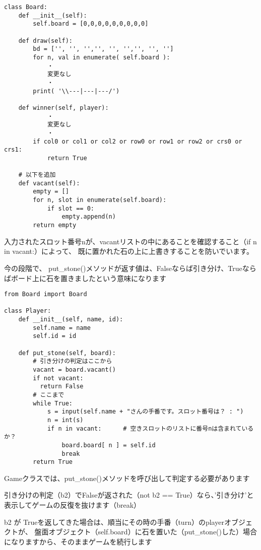 \documentclass[uplatex,a4paper,11pt,oneside,openany]{jsbook}
\begin{document}
\begin{lstlisting}[caption=class Board,label=prog03-5]
class Board:
    def __init__(self):
        self.board = [0,0,0,0,0,0,0,0,0]

    def draw(self):
        bd = ['', '', '','', '', '','', '', '']
        for n, val in enumerate( self.board ):
            ・
            変更なし
            ・
        print( '\\---|---|---/')

    def winner(self, player):
            ・
            変更なし
            ・
        if col0 or col1 or col2 or row0 or row1 or row2 or crs0 or crs1:
            return True

    # 以下を追加
    def vacant(self):
        empty = []
        for n, slot in enumerate(self.board):
            if slot == 0:
                empty.append(n)
        return empty
\end{lstlisting}%

入力されたスロット番号nが、vacantリストの中にあることを確認すること（if n in vacant:）によって、
既に置かれた石の上に上書きすることを防いでいます。

今の段階で、
put\_stone()メソッドが返す値は、Falseならば引き分け、Trueならばボード上に石を置きましたという意味になります

\begin{lstlisting}[caption=class Player,label=prog03-3]
from Board import Board

class Player:
    def __init__(self, name, id):
        self.name = name
        self.id = id

    def put_stone(self, board):
        # 引き分けの判定はここから
        vacant = board.vacant()
        if not vacant:
          return False
        # ここまで
        while True:
            s = input(self.name + "さんの手番です。スロット番号は？ : ")
            n = int(s)
            if n in vacant:      # 空きスロットのリストに番号nは含まれているか？
                board.board[ n ] = self.id
                break
        return True
\end{lstlisting}%

Gameクラスでは、put\_stone()メソッドを呼び出して判定する必要があります

引き分けの判定（b2）でFalseが返された（not b2 == True）なら、'引き分け'と表示してゲームの反復を抜けます（break）

b2 が Trueを返してきた場合は、順当にその時の手番（turn）のplayerオブジェクトが、
盤面オブジェクト（self.board）に石を置いた（put\_stone()した）場合になりますから、そのままゲームを続行します
\end{document}
